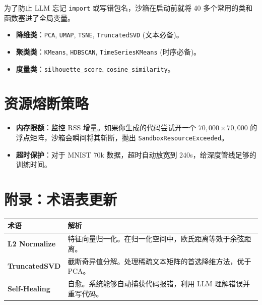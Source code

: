 \documentclass[11pt,a4paper]{ctexbook}
\begin{document}
为了防止 LLM 忘记 \texttt{import} 或写错包名，沙箱在启动前就将 40 多个常用的类和函数塞进了全局变量。

\begin{itemize}
    \item \textbf{降维类}：\texttt{PCA}, \texttt{UMAP}, \texttt{TSNE}, \texttt{TruncatedSVD} (文本必备)。
    \item \textbf{聚类类}：\texttt{KMeans}, \texttt{HDBSCAN}, \texttt{TimeSeriesKMeans} (时序必备)。
    \item \textbf{度量类}：\texttt{silhouette\_score}, \texttt{cosine\_similarity}。
\end{itemize}

\section{资源熔断策略}

\begin{itemize}
    \item \textbf{内存限额}：监控 RSS 增量。如果你生成的代码尝试开一个 $70,000 \times 70,000$ 的浮点矩阵，沙箱会瞬间将其斩断，抛出 \texttt{SandboxResourceExceeded}。
    \item \textbf{超时保护}：对于 MNIST 70k 数据，超时自动放宽到 240s，给深度管线足够的训练时间。
\end{itemize}

\section{附录：术语表更新}

\begin{longtable}{p{3cm} p{10cm}}
    \toprule
    \textbf{术语} & \textbf{解析} \\
    \midrule
    \textbf{L2 Normalize} & 特征向量归一化。在归一化空间中，欧氏距离等效于余弦距离。 \\
    \midrule
    \textbf{TruncatedSVD} & 截断奇异值分解。处理稀疏文本矩阵的首选降维方法，优于 PCA。 \\
    \midrule
    \textbf{Self-Healing} & 自愈。系统能够自动捕获代码报错，利用 LLM 理解错误并重写代码。 \\
    \bottomrule
\end{longtable}
\end{document}
